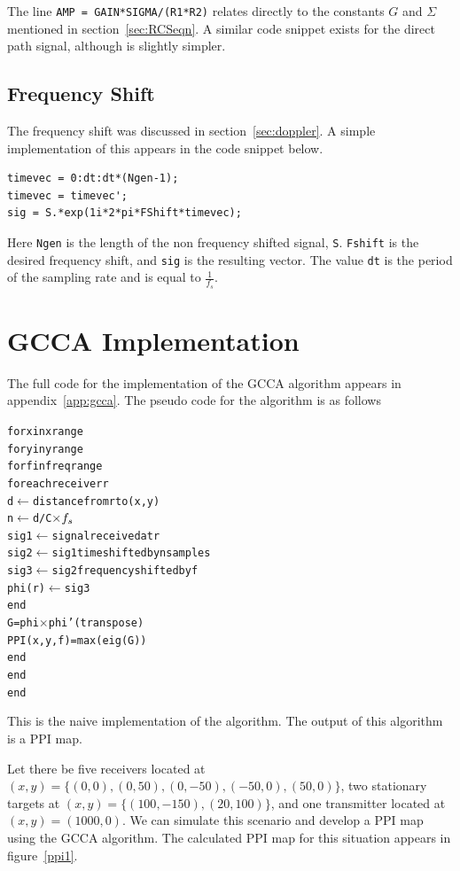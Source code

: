 \documentclass[12pt,openany,a4paper]{book}
\begin{document}
The line \verb+AMP = GAIN*SIGMA/(R1*R2)+ relates directly to the constants $G$ and $\Sigma$ mentioned in section~\ref{sec:RCSeqn}. A similar code snippet exists for the direct path signal, although is slightly simpler.

\subsection{Frequency Shift}
\label{FS}
The frequency shift was discussed in section~\ref{sec:doppler}. A simple implementation of this appears in the code snippet below.

\begin{verbatim}
timevec = 0:dt:dt*(Ngen-1);
timevec = timevec';
sig = S.*exp(1i*2*pi*FShift*timevec);
\end{verbatim}

Here \verb+Ngen+ is the length of the non frequency shifted signal, \verb+S+. \verb+Fshift+ is the desired frequency shift, and \verb+sig+ is the resulting vector. The value \verb+dt+ is the period of the sampling rate and is equal to $\frac{1}{f_s}$.

\section{GCCA Implementation}
\label{gccaI}
The full code for the implementation of the GCCA algorithm appears in appendix~\ref{app:gcca}. The pseudo code for the algorithm is as follows

\begin{alltt}
for x in xrange
    for y in yrange
        for f in freqrange
            for each receiver r
                d \(\gets\) distance from r to (x,y)
                n \(\gets\) d/C \(\times f\sb{s}\)
                sig1 \(\gets\) signal received at r
                sig2 \(\gets\) sig1 time shifted by n samples
                sig3 \(\gets\) sig2 frequency shifted by f                
                phi(r) \(\gets\) sig3
            end
            G = phi \(\times\) phi' (transpose)
            PPI(x,y,f) = max(eig(G))
        end
    end
end
\end{alltt}

This is the naive implementation of the algorithm. The output of this algorithm is a PPI map.

\bigskip

Let there be five receivers located at $(x,y) = \{(0,0), (0,50), (0,-50), (-50,0), (50,0)\}$, two stationary targets at $(x,y) = \{(100,-150), (20, 100)\}$, and one transmitter located at $(x,y) = (1000,0)$. We can simulate this scenario and develop a PPI map using the GCCA algorithm.  The calculated PPI map for this situation appears in figure~\ref{ppi1}.
\end{document}
